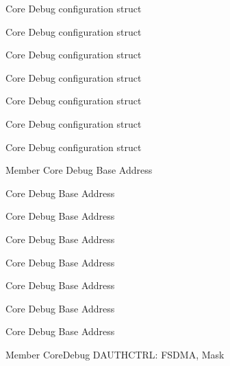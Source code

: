 \begin{DoxyRefList}
\label{deprecated__deprecated000293}%
%
Core Debug configuration struct 

\label{deprecated__deprecated000551}%
%
Core Debug configuration struct 

\label{deprecated__deprecated000653}%
%
Core Debug configuration struct 

\label{deprecated__deprecated000100}%
%
Core Debug configuration struct 

\label{deprecated__deprecated000372}%
%
Core Debug configuration struct 

\label{deprecated__deprecated000448}%
%
Core Debug configuration struct 

\label{deprecated__deprecated000230}%
%
Core Debug configuration struct  
\item[Member \doxylink{group__CMSIS__CoreDebug_ga680604dbcda9e9b31a1639fcffe5230b}{Core\+Debug\+\_\+\+BASE} ]\label{deprecated__deprecated000447}%
%
Core Debug Base Address 

\label{deprecated__deprecated000099}%
%
Core Debug Base Address 

\label{deprecated__deprecated000652}%
%
Core Debug Base Address 

\label{deprecated__deprecated000292}%
%
Core Debug Base Address 

\label{deprecated__deprecated000229}%
%
Core Debug Base Address 

\label{deprecated__deprecated000371}%
%
Core Debug Base Address 

\label{deprecated__deprecated000550}%
%
Core Debug Base Address 

\label{deprecated__deprecated000153}%
%
Core Debug Base Address  
\item[Member \doxylink{group__CMSIS__SCB_gab7f3f76af0236f8d3d3a090f50d4841a}{Core\+Debug\+\_\+\+DAUTHCTRL\+\_\+\+FSDMA\+\_\+\+Msk} ]\label{deprecated__deprecated000535}%
%
Core\+Debug DAUTHCTRL\+: FSDMA, Mask 


\end{DoxyRefList}
